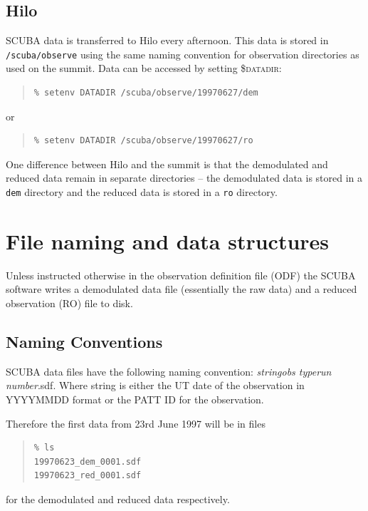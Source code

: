 \documentclass[twoside,11pt]{article}
\newenvironment{myquote}{\begin{quote}\begin{small}}{\end{small}\end{quote}}
\newcommand{\xlabel}[1]{}
\renewcommand{\_}{\texttt{\symbol{95}}}
\begin{document}
\subsection{Hilo}

SCUBA data is transferred to Hilo every afternoon. This data is stored in
\texttt{/scuba/observe} using the same naming convention for observation
directories as used on the summit. Data can be accessed by setting
\textsc{\$datadir}: %

\begin{myquote}
\begin{verbatim}
% setenv DATADIR /scuba/observe/19970627/dem
\end{verbatim}
\end{myquote}
or
\begin{myquote}
\begin{verbatim}
% setenv DATADIR /scuba/observe/19970627/ro
\end{verbatim}
\end{myquote}


One difference between Hilo and the summit is that the demodulated and reduced
data remain in separate directories -- the demodulated data is stored in a
\texttt{dem} directory and the reduced data is stored in a \texttt{ro}
directory.


\section{\xlabel{filenames}File naming and data structures\label{filenames}}

Unless instructed otherwise in the observation definition file (ODF) the
SCUBA software writes a demodulated data file (essentially the raw data) and a
reduced observation (RO) file to disk. 

\subsection{Naming Conventions}

SCUBA data files have the following naming convention: {\it string\_obs
type\_run number}.sdf. Where string is either the UT date of the observation
in YYYYMMDD format or the PATT ID for the observation.

Therefore the first data from 23rd June 1997 will be in files
\begin{myquote}
\begin{verbatim}
% ls
19970623_dem_0001.sdf
19970623_red_0001.sdf
\end{verbatim}
\end{myquote}
for the demodulated and reduced data respectively.
\end{document}
